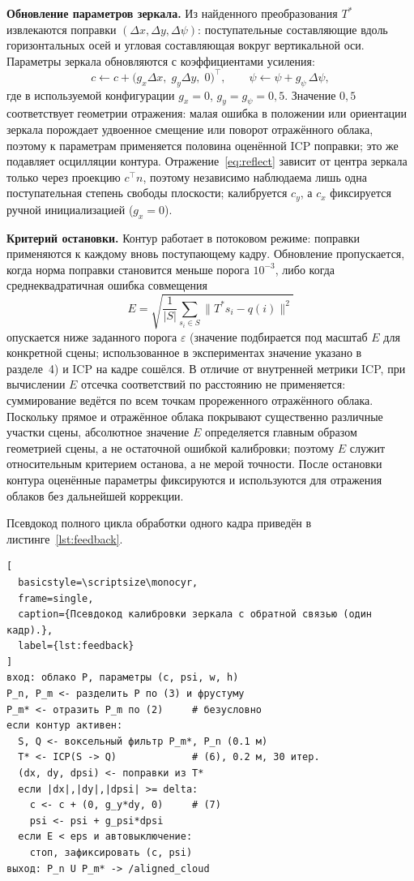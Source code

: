 \documentclass{misisarticle}
\let\monocyr\ttfamily
\begin{document}
\textbf{Обновление параметров зеркала.} Из найденного преобразования
$T^{*}$ извлекаются поправки $(\Delta x, \Delta y, \Delta\psi)$:
поступательные составляющие вдоль горизонтальных осей и угловая
составляющая вокруг вертикальной оси. Параметры зеркала обновляются с
коэффициентами усиления:
\begin{equation}
  c \leftarrow c + \bigl(g_x \Delta x,\; g_y \Delta y,\; 0\bigr)^{\top},
  \qquad
  \psi \leftarrow \psi + g_{\psi}\, \Delta\psi,
  \label{eq:update}
\end{equation}
где в используемой конфигурации $g_x = 0$, $g_y = g_{\psi} = 0{,}5$.
Значение $0{,}5$ соответствует геометрии отражения: малая ошибка в
положении или ориентации зеркала порождает удвоенное смещение или
поворот отражённого облака, поэтому к параметрам применяется половина
оценённой ICP поправки; это же подавляет осцилляции контура.
Отражение~\eqref{eq:reflect} зависит от центра зеркала только через
проекцию $c^{\top} n$, поэтому независимо наблюдаема лишь одна
поступательная степень свободы плоскости; калибруется $c_y$, а $c_x$
фиксируется ручной инициализацией ($g_x = 0$).

\textbf{Критерий остановки.} Контур работает в потоковом режиме:
поправки применяются к каждому вновь поступающему кадру. Обновление
пропускается, когда норма поправки становится меньше порога
$10^{-3}$, либо когда среднеквадратичная ошибка совмещения
\begin{equation}
  E = \sqrt{\frac{1}{|S|}
    \sum_{s_i \in S} \bigl\| T^{*} s_i - q(i) \bigr\|^2}
  \label{eq:rmse}
\end{equation}
опускается ниже заданного порога $\varepsilon$ (значение подбирается
под масштаб $E$ для конкретной сцены; использованное в экспериментах
значение указано в разделе~4) и ICP на кадре сошёлся. В отличие от внутренней
метрики ICP, при вычислении $E$ отсечка соответствий по расстоянию не
применяется: суммирование ведётся по всем точкам прореженного
отражённого облака. Поскольку прямое и отражённое облака покрывают
существенно различные участки сцены, абсолютное значение $E$
определяется главным образом геометрией сцены, а не остаточной
ошибкой калибровки; поэтому $E$ служит относительным критерием
останова, а не мерой точности. После остановки контура оценённые
параметры фиксируются и используются для отражения облаков без
дальнейшей коррекции.

Псевдокод полного цикла обработки одного кадра приведён в
листинге~\ref{lst:feedback}.

\begin{lstlisting}[
  basicstyle=\scriptsize\monocyr,
  frame=single,
  caption={Псевдокод калибровки зеркала с обратной связью (один кадр).},
  label={lst:feedback}
]
вход: облако P, параметры (c, psi, w, h)
P_n, P_m <- разделить P по (3) и фрустуму
P_m* <- отразить P_m по (2)     # безусловно
если контур активен:
  S, Q <- воксельный фильтр P_m*, P_n (0.1 м)
  T* <- ICP(S -> Q)             # (6), 0.2 м, 30 итер.
  (dx, dy, dpsi) <- поправки из T*
  если |dx|,|dy|,|dpsi| >= delta:
    c <- c + (0, g_y*dy, 0)     # (7)
    psi <- psi + g_psi*dpsi
  если E < eps и автовыключение:
    стоп, зафиксировать (c, psi)
выход: P_n U P_m* -> /aligned_cloud
\end{lstlisting}
\end{document}
